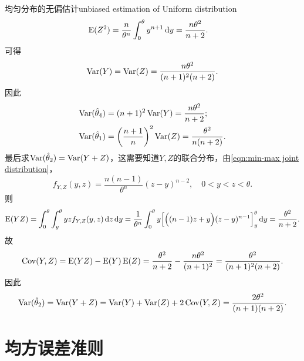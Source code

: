 \begin{example}{均匀分布的无偏估计}{unbiased estimation of Uniform distribution}
\begin{align*}
		\operatorname{E}(Z^2) &= \frac n{\theta^n}\int_0^\theta y^{n+1}\mathop{}\!\mathrm{d} y = \frac{n\theta^2}{n + 2}.
	\end{align*}
	可得 
	\begin{equation}
		\operatorname{Var}(Y) = \operatorname{Var}(Z) = \frac{n\theta^2}{(n + 1)^2(n + 2)}.
	\end{equation}
	因此
	\begin{align*}
		\operatorname{Var}(\hat\theta_4) &= (n + 1)^2\operatorname{Var}(Y) = \frac{n\theta^2}{n + 2};\\
		\operatorname{Var}(\hat\theta_1) &= \biggl(\frac{n + 1}n\biggr)^2\operatorname{Var}(Z) = \frac{\theta^2}{n(n + 2)}.
	\end{align*}
	最后求$\operatorname{Var}(\hat\theta_2) = \operatorname{Var}(Y + Z)$，这需要知道$Y,Z$的联合分布，由\eqref{eqn:min-max joint distribution}，
	\begin{equation}
		f_{Y,Z}(y,z) = \frac{n(n - 1)}{\theta^n}(z - y)^{n-2},\quad 0 < y < z < \theta.
	\end{equation}
	则
	\[
		\operatorname{E}(YZ) = \int_0^\theta\int_y^\theta yzf_{Y,Z}(y,z)\mathop{}\!\mathrm{d} z\mathop{}\!\mathrm{d} y = \frac1{\theta^n}\int_0^\theta y\Bigl[\Bigl((n - 1)z + y\Bigr)(z - y)^{n-1}\Bigr]_y^\theta\mathop{}\!\mathrm{d} y = \frac{\theta^2}{n + 2}.
	\]
	故
	\begin{equation}
		\operatorname{Cov}(Y,Z) = \operatorname{E}(YZ) - \operatorname{E}(Y)\operatorname{E}(Z) = \frac{\theta^2}{n + 2} - \frac{n\theta^2}{(n + 1)^2} = \frac{\theta^2}{(n + 1)^2(n + 2)}.
	\end{equation}
	因此
	\[
		\operatorname{Var}(\hat\theta_2) = \operatorname{Var}(Y + Z) = \operatorname{Var}(Y) + \operatorname{Var}(Z) + 2\operatorname{Cov}(Y,Z) = \frac{2\theta^2}{(n + 1)(n + 2)}.
	\]
\end{example}

\section{均方误差准则}

